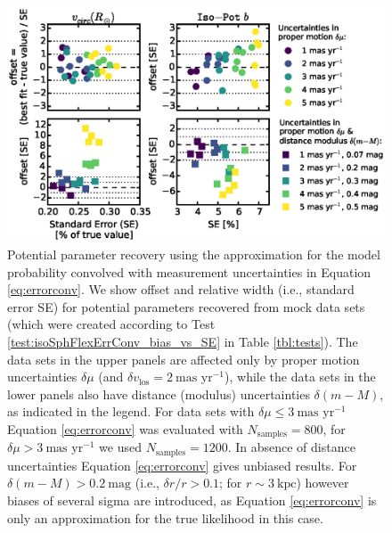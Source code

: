 
\begin{figure}[!htbp]
\centering
\includegraphics[width=\columnwidth]{figs/isoSphFlexErrConv_bias_vs_SE.eps}
\caption{Potential parameter recovery using the approximation for the model probability convolved with measurement uncertainties in Equation \ref{eq:errorconv}. We show  \pdf{} offset and relative width (i.e., standard error SE) for potential parameters recovered from mock data sets (which were created according to Test \ref{test:isoSphFlexErrConv_bias_vs_SE} in Table \ref{tbl:tests}). The data sets in the upper panels are affected only by proper motion uncertainties $\delta \mu$ (and $\delta v_\text{los}=2~\text{mas yr}^{-1}$), while the data sets in the lower panels also have distance (modulus) uncertainties $\delta (m-M)$, as indicated in the legend. For data sets with $\delta \mu \leq 3 ~\text{mas yr}^{-1}$ Equation \ref{eq:errorconv} was evaluated with $N_\text{samples}=800$, for $\delta \mu > 3~\text{mas yr}^{-1}$ we used $N_\text{samples}=1200$. In absence of distance uncertainties Equation \ref{eq:errorconv} gives unbiased results. For $\delta(m-M) > 0.2~\text{mag}$ (i.e., $\delta r/r > 0.1$; for $r \sim 3~\text{kpc}$) however biases of several sigma are introduced, as Equation \ref{eq:errorconv} is only an approximation for the true likelihood in this case.}
\label{fig:isoSphFlexErrConv_bias_vs_SE}
\end{figure}





